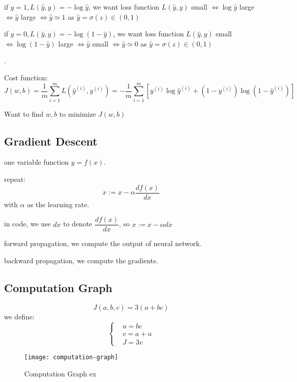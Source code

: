 if $y = 1, L(\hat{y}, y) = - \log \hat{y}$,
we want loss function $L(\hat{y}, y)$ small $\Leftrightarrow \log \hat{y}$ large $\Leftrightarrow \hat{y}$ large $\Leftrightarrow \hat{y} \simeq 1$ as $\hat{y} = \sigma(z) \in (0, 1)$

if $y = 0, L(\hat{y}, y) = - \log (1 - \hat{y})$,
we want loss function $L(\hat{y}, y)$ small $\Leftrightarrow \log (1 - \hat{y})$ large $\Leftrightarrow \hat{y}$ small $\Leftrightarrow \hat{y} \simeq 0$ as $\hat{y} = \sigma(z) \in (0, 1)$


.

Cost function:
$$
J(w, b)
=   \dfrac{1}{m} \sum_{i = 1}^m L(\hat{y}^{(i)}, y^{(i)})
= - \dfrac{1}{m} \sum_{i = 1}^m [y^{(i)} \log \hat{y}^{(i)} + (1 - y^{(i)}) \log (1 - \hat{y}^{(i)})]
$$

Want to find $w, b$ to minimize $J(w, b)$

\subsection{Gradient Descent}
one variable function $y = f(x)$.

repeat: $$x := x - \alpha \dfrac{df(x)}{dx}$$ with $\alpha$ as the learning rate.

in code, we use $dx$ to denote $\dfrac{df(x)}{dx}$, so $x := x - \alpha dx$

forward propagation, we compute the output of neural network.

backward propagation, we compute the gradients.

\subsection{Computation Graph}
$$J(a, b, c) = 3(a + bc)$$
we define:
$$
\left\{
\begin{aligned}
& u = bc \\
& v = a + u \\
& J = 3v
\end{aligned}
\right.
$$

\begin{figure}[htbp]
	\centering
	\texttt{[image: computation-graph]}\\
	\caption{Computation Graph ex}\label{fig.computation-graph}
\end{figure}


